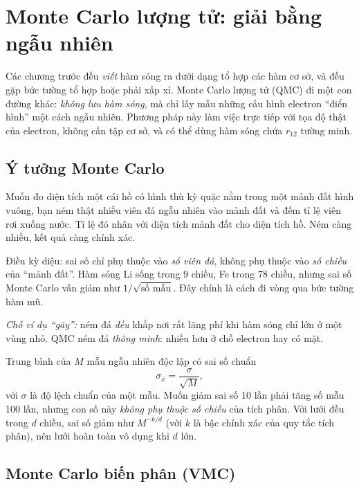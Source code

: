 \chapter{Monte Carlo lượng tử: giải bằng ngẫu nhiên}
\label{ch:qmc}

Các chương trước đều \emph{viết} hàm sóng ra dưới dạng tổ hợp các hàm cơ sở, và đều gặp bức tường tổ hợp hoặc phải xấp xỉ. Monte Carlo lượng tử (QMC) đi một con đường khác: \emph{không lưu hàm sóng}, mà chỉ lấy mẫu những cấu hình electron ``điển hình'' một cách ngẫu nhiên. Phương pháp này làm việc trực tiếp với tọa độ thật của electron, không cần tập cơ sở, và có thể dùng hàm sóng chứa $r_{12}$ tường minh.

\section{Ý tưởng Monte Carlo}

\begin{eli5}
Muốn đo diện tích một cái hồ có hình thù kỳ quặc nằm trong một mảnh đất hình vuông, bạn ném thật nhiều viên đá ngẫu nhiên vào mảnh đất và đếm tỉ lệ viên rơi xuống nước. Tỉ lệ đó nhân với diện tích mảnh đất cho diện tích hồ. Ném càng nhiều, kết quả càng chính xác.

Điều kỳ diệu: sai số chỉ phụ thuộc vào \emph{số viên đá}, không phụ thuộc vào \emph{số chiều} của ``mảnh đất''. Hàm sóng Li sống trong 9 chiều, Fe trong 78 chiều, nhưng sai số Monte Carlo vẫn giảm như $1/\sqrt{\text{số mẫu}}$. Đây chính là cách đi vòng qua bức tường hàm mũ.

\emph{Chỗ ví dụ ``gãy'':} ném đá \emph{đều} khắp nơi rất lãng phí khi hàm sóng chỉ lớn ở một vùng nhỏ. QMC ném đá \emph{thông minh}: nhiều hơn ở chỗ electron hay có mặt.
\end{eli5}

\begin{congthuc}
Trung bình của $M$ mẫu ngẫu nhiên độc lập có sai số chuẩn
\[
\sigma_{\bar x}=\frac{\sigma}{\sqrt M},
\]
với $\sigma$ là độ lệch chuẩn của một mẫu. Muốn giảm sai số 10 lần phải tăng số mẫu 100 lần, nhưng con số này \emph{không phụ thuộc số chiều} của tích phân. Với lưới đều trong $d$ chiều, sai số giảm như $M^{-k/d}$ (với $k$ là bậc chính xác của quy tắc tích phân), nên lưới hoàn toàn vô dụng khi $d$ lớn.
\end{congthuc}

\section{Monte Carlo biến phân (VMC)}

